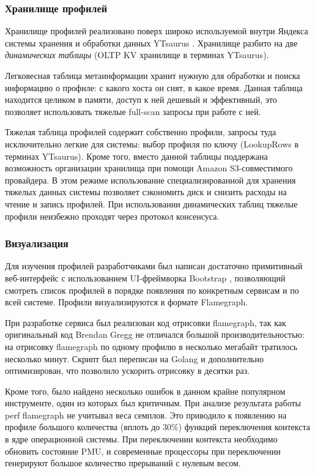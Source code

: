 \subsubsection{Хранилище профилей}
Хранилище профилей реализовано поверх широко используемой внутри Яндекса системы хранения и обработки данных YTsaurus \cite{yt}.
Хранилище разбито на две \textit{динамических таблицы} (OLTP KV хранилище в терминах YTsaurus).

Легковесная таблица метаинформации хранит нужную для обработки и поиска информацию о профиле: с какого хоста он снят, в какое время.
Данная таблица находится целиком в памяти, доступ к ней дешевый и эффективный,
это позволяет использовать тяжелые full-scan запросы при работе с ней.

Тяжелая таблица профилей содержит собственно профили, запросы туда исключительно легкие для системы: выбор профиля по ключу
(LookupRows в терминах YTsaurus). Кроме того, вместо данной таблицы поддержана возможность организации хранилища при помощи
Amazon S3-совместимого провайдера.
В этом режиме использование специализированной для хранения тяжелых данных системы позволяет сэкономить диск и снизить расходы
на чтение и запись профилей. При использовании динамических таблиц тяжелые профили неизбежно проходят через протокол консенсуса.

\subsubsection{Визуализация}
Для изучения профилей разработчиками был написан достаточно примитивный веб-интерфейс с использованием
UI-фреймворка Bootstrap \cite{bootstrap}, позволяющий смотреть список профилей
в порядке появления по конкретным сервисам и по всей системе.
Профили визуализируются в формате Flamegraph.

При разработке сервиса был реализован код отрисовки flamegraph, так как оригинальный код Brendan Gregg \cite{flamegraph}
не отличался большой производительностью: на отрисовку flamegraph по одному профилю в несколько мегабайт тратилось несколько минут.
Скрипт был переписан на Golang и дополнительно оптимизирован, что позволило ускорить отрисовку в десятки раз.

Кроме того, было найдено несколько ошибок в данном крайне популярном инструменте, один из которых был критичным.
При анализе результата работы perf flamegraph не учитывал веса семплов.
Это приводило к появлению на профиле большого количества (вплоть до 30\%) функций переключения контекста в ядре операционной
системы. При переключении контекста необходимо обновить состояние PMU, и современные процессоры при переключении
генерируют большое количество прерываний с нулевым весом.

